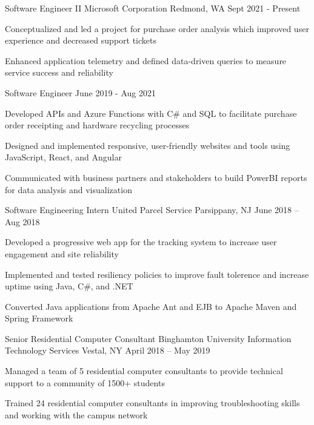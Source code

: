 \documentclass[]{awesome-cv}
\begin{document}
\begin{cventries}
    \cventry
    {Software Engineer II}
    {Microsoft Corporation}
    {Redmond, WA}
    {Sept 2021 - Present}
	{\begin{cvitems}
        \item {Conceptualized and led a project for purchase order analysis which improved user experience and decreased support tickets}
        \item {Enhanced application telemetry and defined data-driven queries to measure service success and reliability}
	\end{cvitems}}
    \cventry
    {Software Engineer}
	{} %
	{} %
	{June 2019 - Aug 2021}
	{\begin{cvitems}
        \item {Developed APIs and Azure Functions with C\# and SQL to facilitate purchase order receipting and hardware recycling processes}
        \item {Designed and implemented responsive, user-friendly websites and tools using JavaScript, React, and Angular}
        \item {Communicated with business partners and stakeholders to build PowerBI reports for data analysis and visualization}
	\end{cvitems}}
	\cventry
    {Software Engineering Intern}
	{United Parcel Service}
	{Parsippany, NJ}
	{June 2018 – Aug 2018}
	{\begin{cvitems}
		\item {Developed a progressive web app for the tracking system to increase user engagement and site reliability}
		\item {Implemented and tested resiliency policies to improve fault tolerence and increase uptime using Java, C\#, and .NET}
		\item {Converted Java applications from Apache Ant and EJB to Apache Maven and Spring Framework}
	\end{cvitems}}
	\cventry
	{Senior Residential Computer Consultant}
	{Binghamton University Information Technology Services}
	{Vestal, NY}
	{April 2018 – May 2019}
	{\begin{cvitems}
		\item {Managed a team of 5 residential computer consultants to provide technical support to a community of 1500+ students}
		\item {Trained 24 residential computer consultants in improving troubleshooting skills and working with the campus network}

\end{cvitems}}
\end{cventries}
\end{document}
